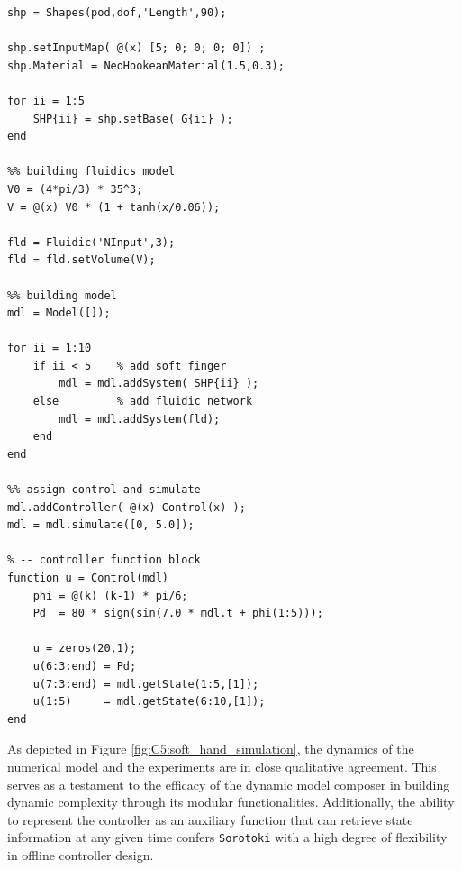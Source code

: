 \clearpage
\begin{lstlisting}[style=matlab]   
%% EXAMPLE: Model class
shp = Shapes(pod,dof,'Length',90);

shp.setInputMap( @(x) [5; 0; 0; 0; 0]) ;
shp.Material = NeoHookeanMaterial(1.5,0.3);

for ii = 1:5
    SHP{ii} = shp.setBase( G{ii} );
end
 
%% building fluidics model 
V0 = (4*pi/3) * 35^3;
V = @(x) V0 * (1 + tanh(x/0.06));

fld = Fluidic('NInput',3);
fld = fld.setVolume(V);

%% building model 
mdl = Model([]);

for ii = 1:10
    if ii < 5    % add soft finger
        mdl = mdl.addSystem( SHP{ii} );
    else         % add fluidic network
        mdl = mdl.addSystem(fld); 
    end
end

%% assign control and simulate
mdl.addController( @(x) Control(x) );
mdl = mdl.simulate([0, 5.0]);

% -- controller function block
function u = Control(mdl)
    phi = @(k) (k-1) * pi/6;
    Pd  = 80 * sign(sin(7.0 * mdl.t + phi(1:5)));

    u = zeros(20,1);
    u(6:3:end) = Pd;
    u(7:3:end) = mdl.getState(1:5,[1]);
    u(1:5)     = mdl.getState(6:10,[1]);
end
\end{lstlisting}

As depicted in Figure \ref{fig:C5:soft_hand_simulation}, the dynamics of the numerical model and the experiments are in close qualitative agreement. This serves as a testament to the efficacy of the dynamic model composer  in building dynamic complexity through its modular functionalities. Additionally, the ability to represent the controller as an auxiliary function that can retrieve state information at any given time confers \texttt{Sorotoki} with a high degree of flexibility in offline controller design.